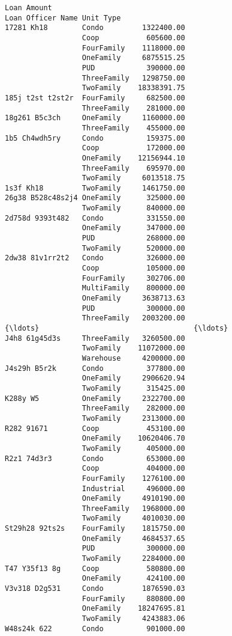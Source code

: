 \documentclass[11pt]{article}
\begin{document}
\begin{Verbatim}[commandchars=\\\{\}]
                               Loan Amount
Loan Officer Name Unit Type               
17281 Kh18        Condo         1322400.00
                  Coop           605600.00
                  FourFamily    1118000.00
                  OneFamily     6875515.25
                  PUD            390000.00
                  ThreeFamily   1298750.00
                  TwoFamily    18338391.75
185j t2st t2st2r  FourFamily     682500.00
                  ThreeFamily    281000.00
18g261 B5c3ch     OneFamily     1160000.00
                  ThreeFamily    455000.00
1b5 Ch4wdh5ry     Condo          159375.00
                  Coop           172000.00
                  OneFamily    12156944.10
                  ThreeFamily    695970.00
                  TwoFamily     6013518.75
1s3f Kh18         TwoFamily     1461750.00
26g38 B528c48s2j4 OneFamily      325000.00
                  TwoFamily      840000.00
2d758d 9393t482   Condo          331550.00
                  OneFamily      347000.00
                  PUD            268000.00
                  TwoFamily      520000.00
2dw38 81v1rr2t2   Condo          326000.00
                  Coop           105000.00
                  FourFamily     302706.00
                  MultiFamily    800000.00
                  OneFamily     3638713.63
                  PUD            300000.00
                  ThreeFamily   2003200.00
{\ldots}                                    {\ldots}
J4h8 61g45d3s     ThreeFamily   3260500.00
                  TwoFamily    11072000.00
                  Warehouse     4200000.00
J4s29h B5r2k      Condo          377800.00
                  OneFamily     2906620.94
                  TwoFamily      315425.00
K288y W5          OneFamily     2322700.00
                  ThreeFamily    282000.00
                  TwoFamily     2313000.00
R282 91671        Coop           453100.00
                  OneFamily    10620406.70
                  TwoFamily      405000.00
R2z1 74d3r3       Condo          653000.00
                  Coop           404000.00
                  FourFamily    1276100.00
                  Industrial     496000.00
                  OneFamily     4910190.00
                  ThreeFamily   1968000.00
                  TwoFamily     4010030.00
St29h28 92ts2s    FourFamily    1815750.00
                  OneFamily     4684537.65
                  PUD            300000.00
                  TwoFamily     2284000.00
T47 Y35f13 8g     Coop           580800.00
                  OneFamily      424100.00
V3v318 D2g531     Condo         1876590.03
                  FourFamily     880800.00
                  OneFamily    18247695.81
                  TwoFamily     4243883.06
W48s24k 622       Condo          901000.00


\end{Verbatim}
\end{document}
